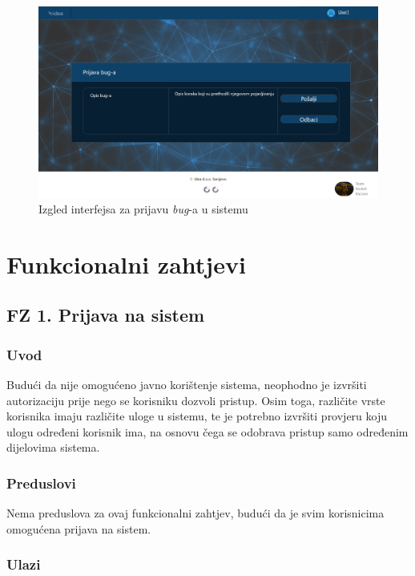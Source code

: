 \documentclass[12pt,a4paper]{article}
\begin{document}
\begin{figure}[H]
\center
\includegraphics[scale=0.4]{../res/Prototype/Bugovi.PNG}
\caption{Izgled interfejsa za prijavu \textit{bug}-a u sistemu}
\label{pt6}
\end{figure}

\section{Funkcionalni zahtjevi}

\subsection{FZ 1. Prijava na sistem}

\subsubsection{Uvod}

Budući da nije omogućeno javno korištenje sistema, neophodno je izvršiti autorizaciju prije nego se korisniku dozvoli pristup. Osim toga, različite vrste korisnika imaju različite uloge u sistemu, te je potrebno izvršiti provjeru koju ulogu određeni korisnik ima, na osnovu čega se odobrava pristup samo određenim dijelovima sistema.

\subsubsection{Preduslovi}

Nema preduslova za ovaj funkcionalni zahtjev, budući da je svim korisnicima omogućena prijava na sistem.

\subsubsection{Ulazi}
\end{document}
